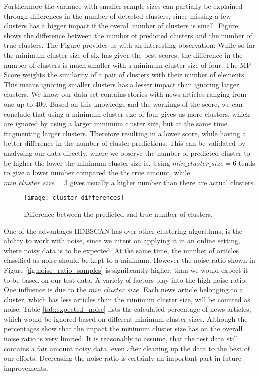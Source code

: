 Furthermore the variance with smaller sample sizes can partially be explained through differences in the number of detected clusters, since missing a few clusters has a bigger impact if the overall number of clusters is small. Figure \label{fig:cluster_difference_samples} shows the difference between the number of predicted clusters and the number of true clusters. The Figure provides us with an interesting observation: While so far the minimum cluster size of six has given the best scores, the difference in the number of clusters is much smaller with a minimum cluster size of four. The MP-Score weights the similarity of a pair of clusters with their number of elements. This means ignoring smaller clusters has a lesser impact than ignoring larger clusters. We know our data set contains stories with news articles ranging from one up to 400. Based on this knowledge and the workings of the score, we can conclude that using a minimum cluster size of four gives us more clusters, which are ignored by using a larger minimum cluster size, but at the same time fragmenting larger clusters. Therefore resulting in a lower score, while having a better difference in the number of cluster predictions. This can be validated by analysing our data directly, where we observe the number of predicted cluster to be higher the lower the minimum cluster size is. Using $min\_cluster\_size=6$ tends to give a lower number compared the the true amount, while $min\_cluster\_size=3$ gives usually a higher number than there are actual clusters.

\begin{figure}[h]
    \centering
    \texttt{[image: cluster\_differences]}
    \caption{Difference between the predicted and true number of clusters.}
    \label{fig:cluster_differences}
\end{figure}

One of the advantages HDBSCAN has over other clustering algorithms, is the ability to work with noise, since we intent on applying it in an online setting, where noisy data is to be expected. At the same time, the number of articles classified as noise should be kept to a minimum. However the noise ratio shown in Figure \ref{fig:noise_ratio_samples} is significantly higher, than we would expect it to be based on our test data. A variety of factors play into the high noise ratio. One influence is due to the $min\_cluster\_size$. Each news article belonging to a cluster, which has less articles than the minimum cluster size, will be counted as noise. Table \ref{tab:expected_noise} lists the calculated percentage of news articles, which would be ignored based on different minimum cluster sizes. Although the percentages show that the impact the minimum cluster size has on the overall noise ratio is very limited. It is reasonably to assume, that the test data still contains a fair amount noisy data, even after cleaning up the data to the best of our efforts. Decreasing the noise ratio is certainly an important part in future improvements.

